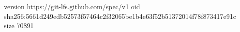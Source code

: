 version https://git-lfs.github.com/spec/v1
oid sha256:5661d249edb52573f57464c2f32065be1b4e63f52b51372014f78f873417e91c
size 70891
